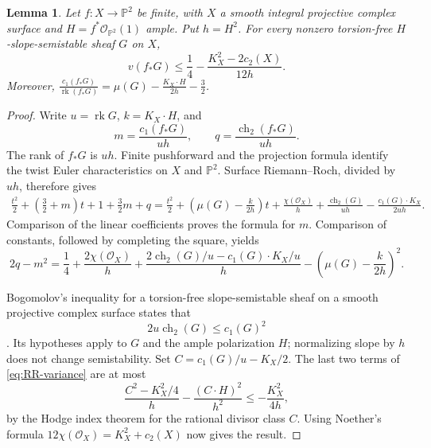 \documentclass[11pt]{article}
\newtheorem{lemma}[theorem]{Lemma}
\theoremstyle{remark}
\newcommand{\PP}{\mathbb P}
\newcommand{\cO}{\mathcal O}
\DeclareMathOperator{\rk}{rk}
\DeclareMathOperator{\ch}{ch}
\begin{document}
\begin{lemma}\label{lem:factor}
Let $f:X\to\PP^2$ be finite, with $X$ a smooth integral projective
complex surface and $H=f^*\cO_{\PP^2}(1)$ ample. Put $h=H^2$.
For every nonzero torsion-free $H$-slope-semistable sheaf $G$ on $X$,
\[
 v(f_*G)\leq\frac14-\frac{K_X^2-2c_2(X)}{12h}.
\]
Moreover,
$\displaystyle\frac{c_1(f_*G)}{\rk(f_*G)}
=\mu(G)-\frac{K_X\cdot H}{2h}-\frac32$.
\end{lemma}
\begin{proof}
Write $u=\rk G$, $k=K_X\cdot H$, and
\[
 m=\frac{c_1(f_*G)}{uh},\qquad q=\frac{\ch_2(f_*G)}{uh}.
\]
The rank of $f_*G$ is $uh$. Finite pushforward and the projection formula
identify the twist Euler characteristics on $X$ and $\PP^2$.
Surface Riemann--Roch, divided by $uh$, therefore gives
\begin{align*}
 \frac{t^2}{2}+\left(\frac32+m\right)t+1+\frac32m+q
 =\frac{t^2}{2}+\left(\mu(G)-\frac{k}{2h}\right)t
 +\frac{\chi(\cO_X)}h
 +\frac{\ch_2(G)}{uh}-\frac{c_1(G)\cdot K_X}{2uh}.
\end{align*}
Comparison of the linear coefficients proves the formula for $m$.
Comparison of constants, followed by completing the square, yields
\begin{equation}\label{eq:RR-variance}
 2q-m^2=\frac14+\frac{2\chi(\cO_X)}h
 +\frac{2\ch_2(G)/u-c_1(G)\cdot K_X/u}{h}
 -\left(\mu(G)-\frac{k}{2h}\right)^2.
\end{equation}

Bogomolov's inequality for a torsion-free slope-semistable sheaf on a
smooth projective complex surface states that
\[
 2u\ch_2(G)\leq c_1(G)^2
\]
\cite[Theorem 3.4.1]{HuybrechtsLehn}. Its hypotheses apply to $G$ and the ample
polarization $H$; normalizing slope by $h$ does not change semistability.
Set $C=c_1(G)/u-K_X/2$. The last two terms of
\eqref{eq:RR-variance} are at most
\[
 \frac{C^2-K_X^2/4}{h}-\frac{(C\cdot H)^2}{h^2}
 \leq-\frac{K_X^2}{4h},
\]
by the Hodge index theorem for the rational divisor class $C$.
Using Noether's formula $12\chi(\cO_X)=K_X^2+c_2(X)$ now gives the result.
\end{proof}
\end{document}
